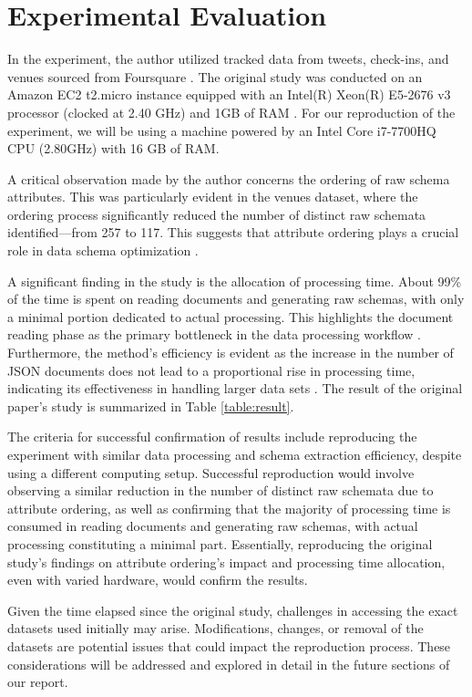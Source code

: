 \documentclass[sigconf, nonacm]{acmart}
\begin{document}
\section{Experimental Evaluation}

In the experiment, the author utilized tracked data from tweets, check-ins, and venues sourced from Foursquare \cite{ccelikten2016modeling}. The original study was conducted on an Amazon EC2 t2.micro instance equipped with an Intel(R) Xeon(R) E5-2676 v3 processor (clocked at 2.40 GHz) and 1GB of RAM \cite{frozza2018approach}. For our reproduction of the experiment, we will be using a machine powered by an Intel Core i7-7700HQ CPU (2.80GHz) with 16 GB of RAM. 

A critical observation made by the author concerns the ordering of raw schema attributes. This was particularly evident in the venues dataset, where the ordering process significantly reduced the number of distinct raw schemata identified—from 257 to 117. This suggests that attribute ordering plays a crucial role in data schema optimization \cite{frozza2018approach}. 

A significant finding in the study is the allocation of processing time. About 99\% of the time is spent on reading documents and generating raw schemas, with only a minimal portion dedicated to actual processing. This highlights the document reading phase as the primary bottleneck in the data processing workflow \cite{frozza2018approach}. Furthermore, the method's efficiency is evident as the increase in the number of JSON documents does not lead to a proportional rise in processing time, indicating its effectiveness in handling larger data sets \cite{frozza2018approach}. The result of the original paper's \cite{frozza2018approach} study is summarized in Table \ref{table:result}.

The criteria for successful confirmation of results include reproducing the experiment with similar data processing and schema extraction efficiency, despite using a different computing setup. Successful reproduction would involve observing a similar reduction in the number of distinct raw schemata due to attribute ordering, as well as confirming that the majority of processing time is consumed in reading documents and generating raw schemas, with actual processing constituting a minimal part. Essentially, reproducing the original study's findings on attribute ordering's impact and processing time allocation, even with varied hardware, would confirm the results.

Given the time elapsed since the original study, challenges in accessing the exact datasets used initially may arise. Modifications, changes, or removal of the datasets are potential issues that could impact the reproduction process. These considerations will be addressed and explored in detail in the future sections of our report.
\end{document}
